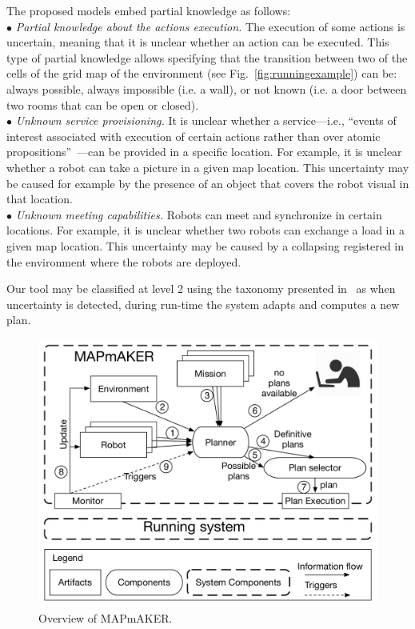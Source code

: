 The proposed models embed partial knowledge as follows:\\
$\bullet$  \emph{Partial knowledge about the actions execution.} 
The execution of some actions is uncertain, meaning that it is unclear whether an action can be executed.
This type of partial knowledge allows specifying that the transition between two of the cells of the grid map of the environment (see Fig.~\ref{fig:runningexample}) can be:
always possible, always impossible (i.e. a wall), or not known (i.e. a door between two rooms that can be open or closed).\\
$\bullet$ \emph{Unknown service provisioning.} 
It is unclear  whether a service---i.e.,  ``events of interest associated with execution of certain actions rather than over atomic propositions''~\cite{guo2015multi}---can be provided in a specific location. 
For example, it is unclear whether a robot can take a picture in a given map location.
This  uncertainty may be caused for example by the presence of an  object that covers the robot visual in that location.\\
$\bullet$ \emph{Unknown meeting capabilities.} Robots can meet and synchronize in certain locations.
For example, it is unclear whether two robots can exchange a load in a given map location.
This uncertainty may be caused by a collapsing registered in the environment where the robots are deployed.

Our tool may be classified at level 2 using the taxonomy presented in~\cite{berry2005four} as when uncertainty is detected, during run-time the system adapts and computes a new plan.


\begin{figure}[t]
\begin{center}
\includegraphics[width=1\linewidth]{Figures/MAPmAKER.pdf}
\caption{Overview of  MAPmAKER.}
\label{fig:overview}
\vspace{-.2cm}
\end{center}
\end{figure}




